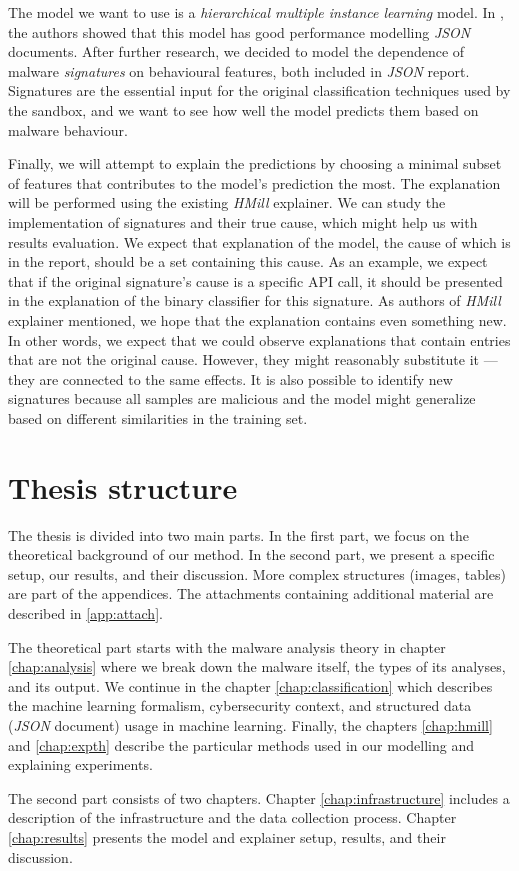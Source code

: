 The model we want to use is a \emph{hierarchical multiple instance learning} model. In \cite{Mandlik2020}, the authors showed that this model has good performance modelling \emph{JSON} documents. After further research, we decided to model the dependence of malware \emph{signatures} on behavioural features, both included in \emph{JSON} report. Signatures are the essential input for the original classification techniques used by the sandbox, and we want to see how well the model predicts them based on malware behaviour.

Finally, we will attempt to explain the predictions by choosing a minimal subset of features that contributes to the model's prediction the most. The explanation will be performed using the existing \emph{HMill} explainer. We can study the implementation of signatures and their true cause, which might help us with results evaluation. We expect that explanation of the model, the cause of which is in the report, should be a set containing this cause. As an example, we expect that if the original signature's cause is a specific API call, it should be presented in the explanation of the binary classifier for this signature. As authors of \emph{HMill} explainer mentioned, we hope that the explanation contains even something new. In other words, we expect that we could observe explanations that contain entries that are not the original cause. However, they might reasonably substitute it --- they are connected to the same effects. It is also possible to identify new signatures because all samples are malicious and the model might generalize based on different similarities in the training set.

\section*{Thesis structure}
The thesis is divided into two main parts. In the first part, we focus on the theoretical background of our method. In the second part, we present a specific setup, our results, and their discussion. More complex structures (images, tables) are part of the appendices. The attachments containing additional material are described in \ref{app:attach}.

The theoretical part starts with the malware analysis theory in chapter \ref{chap:analysis} where we break down the malware itself, the types of its analyses, and its output. We continue in the chapter \ref{chap:classification} which describes the machine learning formalism, cybersecurity context, and structured data (\emph{JSON} document) usage in machine learning. Finally, the chapters \ref{chap:hmill} and \ref{chap:expth} describe the particular methods used in our modelling and explaining experiments.

The second part consists of two chapters. Chapter \ref{chap:infrastructure} includes a description of the infrastructure and the data collection process. Chapter \ref{chap:results} presents the model and explainer setup, results, and their discussion.